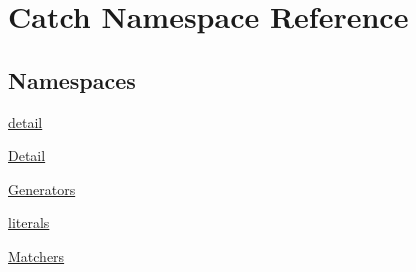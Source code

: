 \hypertarget{namespace_catch}{}\section{Catch Namespace Reference}
\label{namespace_catch}
\subsection*{Namespaces}
\begin{DoxyCompactItemize}
\item 
 \mbox{\hyperlink{namespace_catch_1_1detail}{detail}}
\item 
 \mbox{\hyperlink{namespace_catch_1_1_detail}{Detail}}
\item 
 \mbox{\hyperlink{namespace_catch_1_1_generators}{Generators}}
\item 
 \mbox{\hyperlink{namespace_catch_1_1literals}{literals}}
\item 
 \mbox{\hyperlink{namespace_catch_1_1_matchers}{Matchers}}
\end{DoxyCompactItemize}
